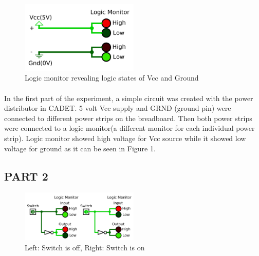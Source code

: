\documentclass[pdftex,12pt,a4paper]{article}
\begin{document}
\begin{figure}[ht]
	\centering
	\includegraphics[width=0.5\textwidth]{part1_800.png}	
	\caption{Logic monitor revealing logic states of Vcc and Ground}
	\label{fig1}
\end{figure}
\begin{flushleft}
\paragraph{}
In the first part of the experiment, a simple circuit was created with the power distributor in CADET. 5 volt Vcc supply and GRND (ground pin) were connected to different power strips on the breadboard. Then both power strips were connected to a logic monitor(a different monitor for each individual power strip). Logic monitor showed high voltage for Vcc source while it showed low voltage for ground as it can be seen in Figure 1.
\end{flushleft}


\begin{flushleft}
\subsection{PART 2}
\end{flushleft}

\begin{figure}[ht]
	\centering
	\includegraphics[width=0.5\textwidth]{part2_800.png}	
	\caption{Left: Switch is off, Right: Switch is on}
	\label{fig2}
\end{figure}
\end{document}
